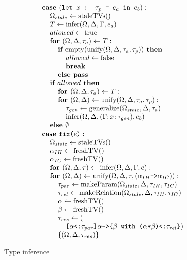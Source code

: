 \documentclass[acmsmall]{acmart}
\begin{document}
\begin{figure*}[h]
\[\begin{array}[t]{@{} l}
    \I \B{case } (\code{let $x$ : $\tau_p$ = $e_a$ in $e_b$}) :  
    \\
    \I\I \Omega_{stale} \leftarrow \F{staleTVs}()
    \\
    \I\I T \leftarrow \F{infer}(\Omega, \Delta, \Gamma, e_a)
    \\
    \I\I allowed \leftarrow \F{true}
    \\
    \I\I \B{for } (\Omega, \Delta, \tau_a) \leftarrow T:
    \\
    \I\I\I \B{if } \F{empty}(\F{unify}(\Omega, \Delta, \tau_a, \tau_p)) \B{ then }
    \\
    \I\I\I\I allowed \leftarrow \F{false}
    \\
    \I\I\I\I \B{break}
    \\
    \I\I\I \B{else } \B{pass}
    \\
    \I\I \B{if } allowed \B{ then }
    \\
    \I\I\I \B{for } (\Omega, \Delta, \tau_a) \leftarrow T:
    \\
    \I\I\I \B{for } (\Omega, \Delta) \leftarrow \F{unify}(\Omega, \Delta, \tau_a, \tau_p):
    \\
    \I\I\I\I \tau_{gen} \leftarrow \F{generalize}(\Omega_{stale}, \Delta, \tau_a)
    \\
    \I\I\I\I \F{infer}(\Omega, \Delta, (\Gamma;\code{$x$:$\tau_{gen}$}), e_b)
    \\
    \I\I \B{else } \emptyset 

    \\

    \I \B{case } \code{fix($e$)} :  
    \\
    \I\I \Omega_{stale} \leftarrow \F{staleTVs}()
    \\
    \I\I \alpha_{IH} \leftarrow \F{freshTV}()
    \\
    \I\I \alpha_{IC} \leftarrow \F{freshTV}()
    \\
    \I\I \B{for } (\Omega, \Delta, \tau) \leftarrow \F{infer}(\Omega, \Delta, \Gamma, e):
    \\
    \I\I \B{for } (\Omega, \Delta) \leftarrow \F{unify}(\Omega, \Delta, \tau, (\code{$\alpha_{IH}$->$\alpha_{IC}$})): 
    \\
    \I\I\I \tau_{par} \leftarrow \F{makeParam}(\Omega_{stale}, \Delta, \tau_{IH}, \tau_{IC})
    \\
    \I\I\I \tau_{rel} \leftarrow \F{makeRelation}(\Omega_{stale}, \Delta, \tau_{IH}, \tau_{IC})
    \\
    \I\I\I \alpha \leftarrow \F{freshTV}()
    \\
    \I\I\I \beta \leftarrow \F{freshTV}()
    \\
    \I\I\I \tau_{res} \leftarrow (
    \\
    \I\I\I\I \code{[$\alpha$<:$\tau_{par}$]$\alpha$->\{$\beta$ with ($\alpha$*$\beta$)<:$\tau_{rel}$\}})
    \\
    \I\I\I \{(\Omega, \Delta, \tau_{res})\}

\end{array}
\]
\caption{Type inference}
\end{figure*}
\end{document}
